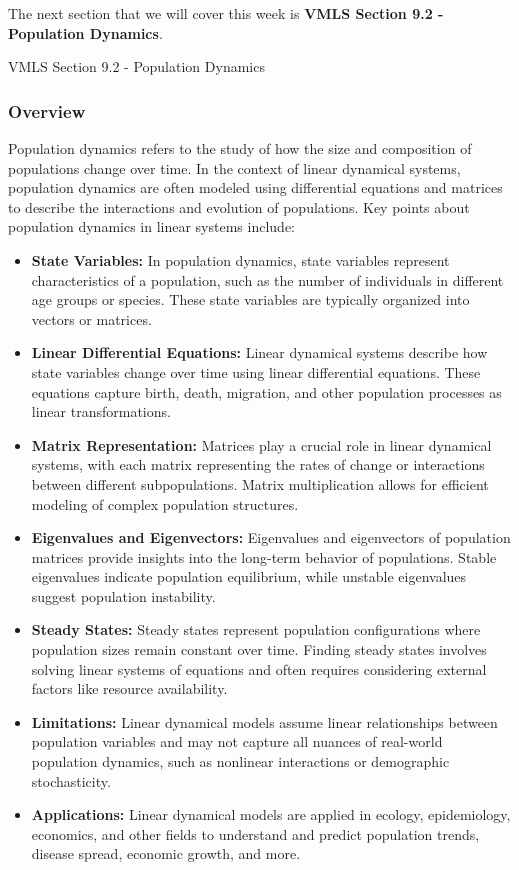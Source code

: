 The next section that we will cover this week is \textbf{VMLS Section 9.2 - Population Dynamics}.

\begin{notes}{VMLS Section 9.2 - Population Dynamics}
    \subsubsection*{Overview}

    Population dynamics refers to the study of how the size and composition of populations change over time. In the context of linear dynamical systems, population dynamics are often modeled using 
    differential equations and matrices to describe the interactions and evolution of populations. Key points about population dynamics in linear systems include:

    \begin{itemize}
        \item \textbf{State Variables:} In population dynamics, state variables represent characteristics of a population, such as the number of individuals in different age groups or species. These 
        state variables are typically organized into vectors or matrices.
        \item \textbf{Linear Differential Equations:} Linear dynamical systems describe how state variables change over time using linear differential equations. These equations capture birth, death, 
        migration, and other population processes as linear transformations.
        \item \textbf{Matrix Representation:} Matrices play a crucial role in linear dynamical systems, with each matrix representing the rates of change or interactions between different subpopulations. 
        Matrix multiplication allows for efficient modeling of complex population structures.
        \item \textbf{Eigenvalues and Eigenvectors:} Eigenvalues and eigenvectors of population matrices provide insights into the long-term behavior of populations. Stable eigenvalues indicate 
        population equilibrium, while unstable eigenvalues suggest population instability.
        \item \textbf{Steady States:} Steady states represent population configurations where population sizes remain constant over time. Finding steady states involves solving linear systems of 
        equations and often requires considering external factors like resource availability.
        \item \textbf{Limitations:} Linear dynamical models assume linear relationships between population variables and may not capture all nuances of real-world population dynamics, such as nonlinear 
        interactions or demographic stochasticity.
        \item \textbf{Applications:} Linear dynamical models are applied in ecology, epidemiology, economics, and other fields to understand and predict population trends, disease spread, economic 
        growth, and more.
    \end{itemize}
    

\end{notes}
